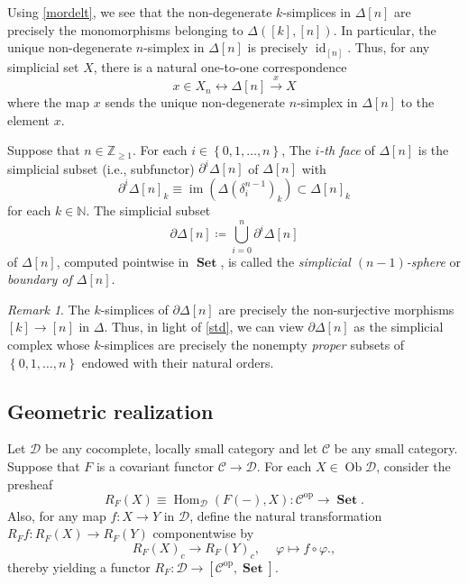 \documentclass[10pt,letterpaper,cm]{nupset}
\theoremstyle{definition}
\theoremstyle{theorem}
\theoremstyle{remark}
\newtheorem{remark}[definition]{Remark}
\newcommand{\Z}{\mathbb Z}
\DeclareMathOperator{\im}{im}
\DeclareMathOperator{\ob}{Ob}
\newcommand{\0}{\mathbf{0}}
\newcommand{\1}{\mathbf{1}}
\newcommand{\2}{\mathbf{2}}
\DeclareMathOperator{\op}{op}
\DeclareMathOperator{\set}{\mathbf{Set}}
\renewcommand{\c}{\mathscr{C}}
\renewcommand{\d}{\mathscr{D}}
\newcommand{\N}{\mathbb N}
\DeclareMathOperator{\Hom}{Hom}
\DeclareMathOperator{\idd}{id}
\begin{document}
Using \cref{mordelt}, we see that the non-degenerate $k$-simplices in $\Delta[n]$ are precisely the monomorphisms belonging to $\varDelta\left(\left[k\right], \left[n\right]\right)$.  In particular, the unique non-degenerate $n$-simplex in $\Delta[n]$ is precisely $\idd_{\left[n\right]}$. Thus, for any simplicial set $X$, there is a natural one-to-one correspondence 
\[
x\in X_n \longleftrightarrow \Delta[n] \overset{x}{\to} X
\] where the map $x$ sends the unique non-degenerate $n$-simplex in $\Delta[n]$ to the element $x$.

\medskip


Suppose that $n\in \Z_{\geq 1}$. For each $i\in \left\{0,1, \ldots, n\right\}$, The \textit{$i$-th face} of $\Delta[n]$ is the simplicial subset (i.e., subfunctor) $\partial^i{\Delta[n]}$ of $\Delta[n]$ with $$\partial^i{\Delta[n]}_k \equiv \im(\Delta(\delta_i^{n-1})_k) \subset \Delta[n]_k$$ for each $k\in \N$. The simplicial subset
\[
\partial{\Delta[n]} \coloneqq \bigcup_{i=0}^n\partial^i{\Delta[n]}
\] of $\Delta[n]$, computed pointwise in $\set$,  is called the \textit{simplicial $\left(n-1\right)$-sphere} or \textit{boundary of $\Delta[n]$}. 

\begin{remark}
The $k$-simplices of $\partial{\Delta[n]}$ are precisely the non-surjective morphisms $\left[k\right]\to \left[n\right]$ in $\varDelta$. Thus, in light of \cref{std}, we can view $\partial{\Delta[n]}$ as the simplicial complex whose $k$-simplices are precisely the nonempty \emph{proper} subsets of $\left\{0, 1, \ldots, n\right\}$ endowed with their natural orders.
\end{remark}

\subsection*{Geometric realization}

Let $\d$ be any cocomplete, locally small category and let $\c$ be any small category. Suppose that $F$ is a covariant functor $ \c \to \d$. For each $X \in \ob{\d}$, consider the presheaf $$R_F(X)\equiv \Hom_{\d}(F({-}), X) : \c^{\op} \to \set.$$ Also, for any map $f : X\to Y$ in $\d$, define the natural transformation $R_F{f} : R_F(X)  \to R_F(Y)$ componentwise by
\[
R_F(X)_c \to R_F(Y)_c,\ \quad \varphi \mapsto f \circ \varphi.
,\] thereby yielding a functor $R_F: \d \to \left[\c^{\op}, \set\right]$. 
\end{document}
